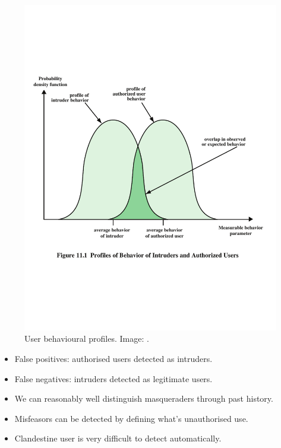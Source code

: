 \documentclass{beamer}
\begin{document}
\begin{frame}{\insertsubsectionhead}
  \begin{figure}
    \includegraphics[height=0.7\textheight]{profiles.pdf}
    \caption{User behavioural profiles.
      Image: \cite{Stallings2013nse}.}
  \end{figure}
\end{frame}

\begin{frame}{\insertsubsectionhead}
  \begin{itemize}
    \item False positives: authorised users detected as intruders.

    \item False negatives: intruders detected as legitimate users.

    \item We can reasonably well distinguish masqueraders through past history.

    \item Misfeasors can be detected by defining what's unauthorised use.

    \item Clandestine user is very difficult to detect automatically.

  \end{itemize}
\end{frame}
\end{document}
